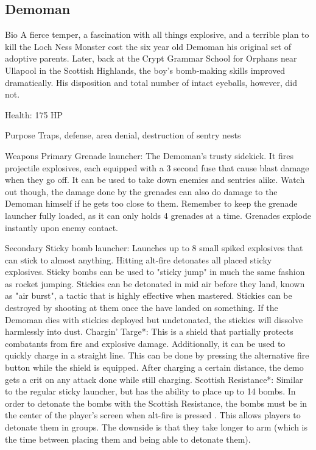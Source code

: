 \subsection{Demoman}
Bio
A fierce temper, a fascination with all things explosive, and a terrible plan to kill the Loch Ness Monster cost the six year old Demoman his original set of adoptive parents. Later, back at the Crypt Grammar School for Orphans near Ullapool in the Scottish Highlands, the boy's bomb-making skills improved dramatically. His disposition and total number of intact eyeballs, however, did not.

Health: 175 HP

Purpose
Traps, defense, area denial, destruction of sentry nests

Weapons
Primary
Grenade launcher: The Demoman's trusty sidekick. It fires projectile explosives, each equipped with a 3 second fuse that cause blast damage when they go off. It can be used to take down enemies and sentries alike. Watch out though, the damage done by the grenades can also do damage to the Demoman himself if he gets too close to them. Remember to keep the grenade launcher fully loaded, as it can only holds 4 grenades at a time. Grenades explode instantly upon enemy contact.

Secondary
Sticky bomb launcher: Launches up to 8 small spiked explosives that can stick to almost anything. Hitting alt-fire detonates all placed sticky explosives. Sticky bombs can be used to "sticky jump" in much the same fashion as rocket jumping. Stickies can be detonated in mid air before they land, known as "air burst", a tactic that is highly effective when mastered. Stickies can be destroyed by shooting at them once the have landed on something. If the Demoman dies with stickies deployed but undetonated, the stickies will dissolve harmlessly into dust.
Chargin' Targe*: This is a shield that partially protects combatants from fire and explosive damage.  Additionally, it can be used to quickly charge in a straight line.  This can be done by pressing the alternative fire button while the shield is equipped. After charging a certain distance, the demo gets a crit on any attack done while still charging. 
Scottish Resistance*: Similar to the regular sticky launcher, but has the ability to place up to 14 bombs. In order to detonate the bombs with the Scottish Resistance, the bombs must be in the center of the player's screen when alt-fire is pressed . This allows players to detonate them in groups. The downside is that they take longer to arm (which is the time between placing them and being able to detonate them).

